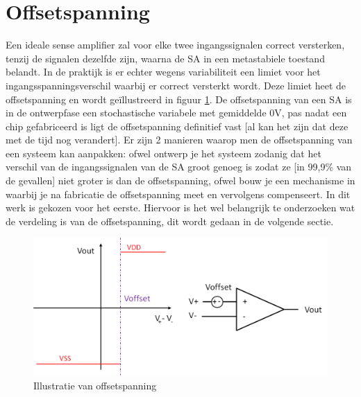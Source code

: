 \section{Offsetspanning}
Een ideale sense amplifier zal voor elke twee ingangssignalen correct versterken, tenzij de signalen dezelfde zijn, waarna de SA in een metastabiele toestand belandt. In de praktijk is er echter wegens variabiliteit een limiet voor het ingangsspanningsverschil waarbij er correct versterkt wordt. Deze limiet heet de offsetspanning en wordt geïllustreerd in figuur \ref{fig:offset}. De offsetspanning van een SA is in de ontwerpfase een stochastische variabele met gemiddelde 0V, pas nadat een chip gefabriceerd is ligt de offsetspanning definitief vast [al kan het zijn dat deze met de tijd nog verandert].
Er zijn 2 manieren waarop men de offsetspanning van een systeem kan aanpakken: ofwel ontwerp je het systeem zodanig dat het verschil van de ingangssignalen van de SA groot genoeg is zodat ze [in 99,9\% van de gevallen] niet groter is dan de offsetspanning, ofwel bouw je een mechanisme in waarbij je na fabricatie de offsetspanning meet en vervolgens compenseert. In dit werk is gekozen voor het eerste.
Hiervoor is het wel belangrijk te onderzoeken wat de verdeling is van de offsetspanning, dit wordt gedaan in de volgende sectie.

\begin{figure}
  \centering
  \includegraphics[scale=0.4]{../fig/hfdstk-sensamp-offset.png}
  \caption{Illustratie van offsetspanning}
  \label{fig:offset}
\end{figure}

